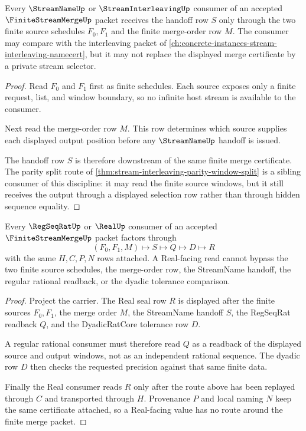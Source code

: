 \begin{theorem}
\label{thm:finite-stream-merge-streamname-handoff}
Every $\StreamNameUp$ or $\StreamInterleavingUp$ consumer of an accepted $\FiniteStreamMergeUp$ packet receives the handoff row $S$ only through the two finite source schedules $F_0,F_1$ and the finite merge-order row $M$. The consumer may compare with the interleaving packet of \autoref{ch:concrete-instances-stream-interleaving-namecert}, but it may not replace the displayed merge certificate by a private stream selector.
\end{theorem}
\begin{proof}
Read $F_0$ and $F_1$ first as finite schedules. Each source exposes only a finite request, list, and window boundary, so no infinite host stream is available to the consumer.

Next read the merge-order row $M$. This row determines which source supplies each displayed output position before any $\StreamNameUp$ handoff is issued.

The handoff row $S$ is therefore downstream of the same finite merge certificate. The parity split route of \autoref{thm:stream-interleaving-parity-window-split} is a sibling consumer of this discipline: it may read the finite source windows, but it still receives the output through a displayed selection row rather than through hidden sequence equality.
\end{proof}

\begin{theorem}
\label{thm:finite-stream-merge-real-nonescape}
Every $\RegSeqRatUp$ or $\RealUp$ consumer of an accepted $\FiniteStreamMergeUp$ packet factors through
$$
(F_0,F_1,M)\longmapsto S\longmapsto Q\longmapsto D\longmapsto R
$$
with the same $H,C,P,N$ rows attached. A Real-facing read cannot bypass the two finite source schedules, the merge-order row, the StreamName handoff, the regular rational readback, or the dyadic tolerance comparison.
\end{theorem}
\begin{proof}
Project the carrier. The Real seal row $R$ is displayed after the finite sources $F_0,F_1$, the merge order $M$, the StreamName handoff $S$, the RegSeqRat readback $Q$, and the DyadicRatCore tolerance row $D$.

A regular rational consumer must therefore read $Q$ as a readback of the displayed source and output windows, not as an independent rational sequence. The dyadic row $D$ then checks the requested precision against that same finite data.

Finally the Real consumer reads $R$ only after the route above has been replayed through $C$ and transported through $H$. Provenance $P$ and local naming $N$ keep the same certificate attached, so a Real-facing value has no route around the finite merge packet.
\end{proof}

